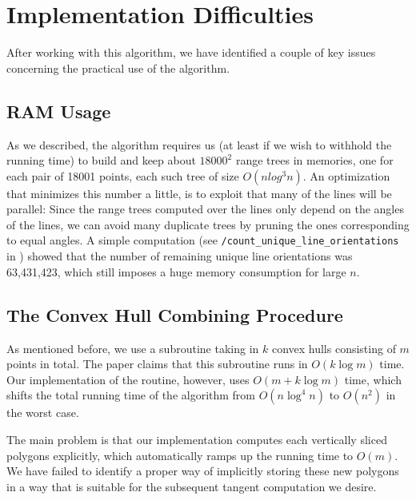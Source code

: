 \documentclass{article}
\begin{document}


\section{Implementation Difficulties}

After working with this algorithm, we have identified a couple of key issues concerning the practical use of the algorithm.

\subsection{RAM Usage}

As we described, the algorithm requires us (at least if we wish to withhold the running time) to build and keep about $18000^2$ range trees in memories, one for each pair of 18001 points, each such tree of size $O(n log^3 n)$. An optimization that minimizes this number a little, is to exploit that many of the lines will be parallel: Since the range trees computed over the lines only depend on the angles of the lines, we can avoid many duplicate trees by pruning the ones corresponding to equal angles. A simple computation (see \texttt{/count\_unique\_line\_orientations} in \cite{hm18}) showed that the number of remaining unique line orientations was 63,431,423, which still imposes a huge memory consumption for large $n$.

\subsection{The Convex Hull Combining Procedure}

As mentioned before, we use a subroutine taking in $k$ convex hulls consisting of $m$ points in total. The paper claims that this subroutine runs in $O(k \log m)$ time. Our implementation of the routine, however, uses $O(m + k\log m)$ time, which shifts the total running time of the algorithm from $O(n \log^4 n)$ to $O(n^2)$ in the worst case.

The main problem is that our implementation computes each vertically sliced polygons explicitly, which automatically ramps up the running time to $O(m)$. We have failed to identify a proper way of implicitly storing these new polygons in a way that is suitable for the subsequent tangent computation we desire. 
\end{document}
